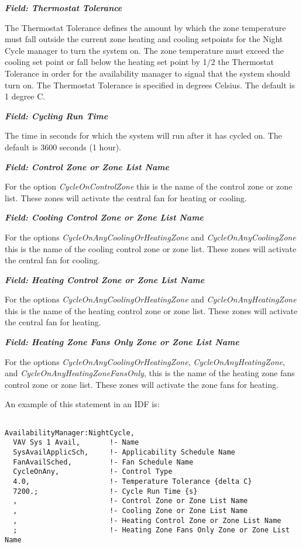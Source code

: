 \textbf{\emph{Field: Thermostat Tolerance}}

The Thermostat Tolerance defines the amount by which the zone temperature must fall outside the current zone heating and cooling setpoints for the Night Cycle manager to turn the system on. The zone temperature must exceed the cooling set point or fall below the heating set point by 1/2 the Thermostat Tolerance in order for the availability manager to signal that the system should turn on. The Thermostat Tolerance is specified in degrees Celsius. The default is 1 degree C.

\textbf{\emph{Field: Cycling Run Time}}

The time in seconds for which the system will run after it has cycled on. The default is 3600 seconds (1 hour).

\textbf{\emph{Field: Control Zone or Zone List Name}}

For the option \emph{CycleOnControlZone} this is the name of the control zone or zone list. These zones will activate the central fan for heating or cooling.

\textbf{\emph{Field: Cooling Control Zone or Zone List Name}}

For the options \emph{CycleOnAnyCoolingOrHeatingZone} and  \emph{CycleOnAnyCoolingZone}  this is the name of the cooling control zone or zone list. These zones will activate the central fan for cooling.

\textbf{\emph{Field: Heating Control Zone or Zone List Name}}

For the options \emph{CycleOnAnyCoolingOrHeatingZone} and  \emph{CycleOnAnyHeatingZone}  this is the name of the heating control zone or zone list. These zones will activate the central fan for heating.

\textbf{\emph{Field: Heating Zone Fans Only Zone or Zone List Name}}

For the options \emph{CycleOnAnyCoolingOrHeatingZone}, \emph{CycleOnAnyHeatingZone}, and \emph{CycleOnAnyHeatingZoneFansOnly},  this is the name of the heating zone fans control zone or zone list. These zones will activate the zone fans for heating.

An example of this statement in an IDF is:

\begin{lstlisting}

AvailabilityManager:NightCycle,
  VAV Sys 1 Avail,       !- Name
  SysAvailApplicSch,     !- Applicability Schedule Name
  FanAvailSched,         !- Fan Schedule Name
  CycleOnAny,            !- Control Type
  4.0,                   !- Temperature Tolerance {delta C}
  7200.;                 !- Cycle Run Time {s}
  ,                      !- Control Zone or Zone List Name
  ,                      !- Cooling Zone or Zone List Name
  ,                      !- Heating Control Zone or Zone List Name
  ;                      !- Heating Zone Fans Only Zone or Zone List Name
\end{lstlisting}


